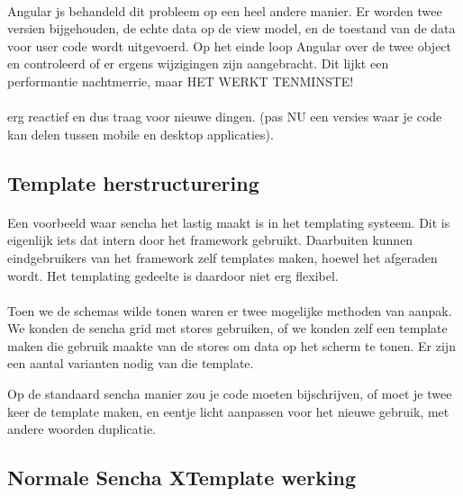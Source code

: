 \paragraph {} Angular js behandeld dit probleem op een heel andere manier. Er worden twee
versien bijgehouden, de echte data op de view model, en de toestand van de data voor user
code wordt uitgevoerd. Op het einde loop Angular over de twee object en controleerd of er
ergens wijzigingen zijn aangebracht. Dit lijkt een performantie nachtmerrie, maar HET
WERKT TENMINSTE!


\paragraph {} erg reactief en dus traag voor nieuwe dingen. (pas NU een versies waar je
code kan delen tussen mobile en desktop applicaties).


\subsection {Template herstructurering}

\paragraph {} Een voorbeeld waar sencha het lastig maakt is in het templating systeem. Dit
is eigenlijk iets dat intern door het framework gebruikt. Daarbuiten kunnen eindgebruikers
van het framework zelf templates maken, hoewel het afgeraden wordt. Het templating
gedeelte is daardoor niet erg flexibel.

\paragraph {} Toen we de schemas wilde tonen waren er twee mogelijke methoden van aanpak.
We konden de sencha grid met stores gebruiken, of we konden zelf een template maken die
gebruik maakte van de stores om data op het scherm te tonen. Er zijn een aantal varianten
nodig van die template.

Op de standaard sencha manier zou je code moeten bijschrijven, of moet je twee keer de
template maken, en eentje licht aanpassen voor het nieuwe gebruik, met andere woorden
duplicatie.


\subsection {Normale Sencha XTemplate werking}

